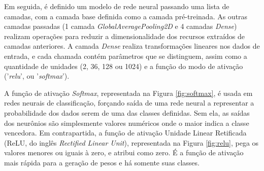 Em seguida, é definido um modelo de rede neural passando uma lista de camadas, com a camada base definida como a camada pré-treinada. As outras camadas passadas (1 camada \textit{GlobalAveragePooling2D} e 4 camadas \textit{Dense}) realizam operações para reduzir a dimensionalidade dos recursos extraídos de camadas anteriores. A camada \textit{Dense} realiza transformações lineares nos dados de entrada, e cada chamada contém parâmetros que se distinguem, assim como a quantidade de unidades (2, 36, 128 ou 1024) e a função do modo de ativação ('\textit{relu}', ou '\textit{softmax}'). 

A função de ativação \textit{Softmax}, representada na Figura \ref{fig:softmax}, é usada em redes neurais de classificação, forçando saída de uma rede neural a representar a probabilidade dos dados serem de uma das classes definidas. Sem ela, as saídas dos neurônios são simplesmente valores numéricos onde o maior indica a classe vencedora. Em contrapartida, a função de ativação Unidade Linear Retificada (ReLU, do inglês \textit{Rectified Linear Unit}), representada na Figura \ref{fig:relu}, pega os valores menores ou iguais à zero, e atribui como zero. É a função de ativação mais rápida para a geração de pesos e há somente suas classes.

